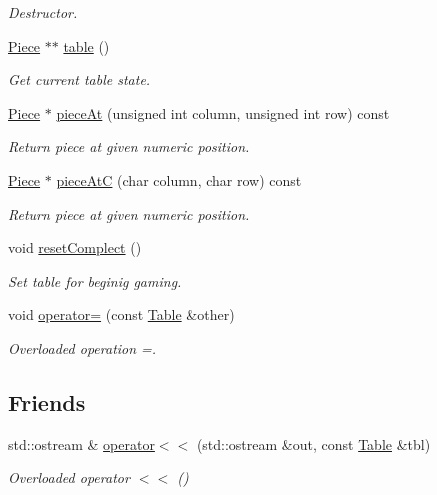 \begin{DoxyCompactItemize}
\begin{DoxyCompactList}\small\item\em Destructor. \item\end{DoxyCompactList}\item 
\hyperlink{classChEngn_1_1Piece}{Piece} $\ast$$\ast$ \hyperlink{classChEngn_1_1Table_a7e403087a7979907ca171e20462f8346}{table} ()
\begin{DoxyCompactList}\small\item\em Get current table state. \item\end{DoxyCompactList}\item 
\hyperlink{classChEngn_1_1Piece}{Piece} $\ast$ \hyperlink{classChEngn_1_1Table_a5f797f91cf61269b04d19ede97875ba4}{pieceAt} (unsigned int column, unsigned int row) const 
\begin{DoxyCompactList}\small\item\em Return piece at given numeric position. \item\end{DoxyCompactList}\item 
\hyperlink{classChEngn_1_1Piece}{Piece} $\ast$ \hyperlink{classChEngn_1_1Table_a715d819b37f5cb853209ac36d06c8a89}{pieceAtC} (char column, char row) const 
\begin{DoxyCompactList}\small\item\em Return piece at given numeric position. \item\end{DoxyCompactList}\item 
void \hyperlink{classChEngn_1_1Table_a8ece9e9f9f28f209d72f16db0fb2aeed}{resetComplect} ()
\begin{DoxyCompactList}\small\item\em Set table for beginig gaming. \item\end{DoxyCompactList}\item 
void \hyperlink{classChEngn_1_1Table_a5b45cb67e40f75358145826e72b319b4}{operator=} (const \hyperlink{classChEngn_1_1Table}{Table} \&other)
\begin{DoxyCompactList}\small\item\em Overloaded operation =. \item\end{DoxyCompactList}\end{DoxyCompactItemize}
\subsection*{Friends}
\begin{DoxyCompactItemize}
\item 
std::ostream \& \hyperlink{classChEngn_1_1Table_a9a39b79ad3a5635dfe8075f14598886e}{operator$<$$<$} (std::ostream \&out, const \hyperlink{classChEngn_1_1Table}{Table} \&tbl)
\begin{DoxyCompactList}\small\item\em Overloaded operator $<$$<$ () \item\end{DoxyCompactList}\end{DoxyCompactItemize}


